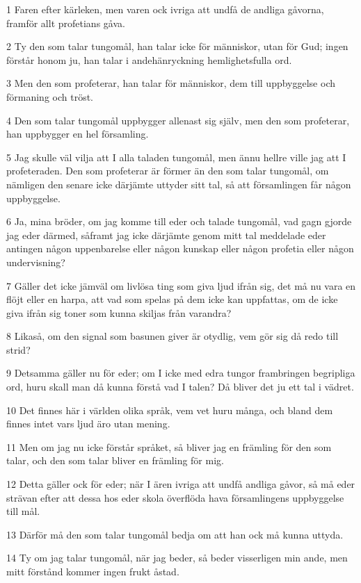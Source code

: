\par 1 Faren efter kärleken, men varen ock ivriga att undfå de andliga gåvorna, framför allt profetians gåva.
\par 2 Ty den som talar tungomål, han talar icke för människor, utan för Gud; ingen förstår honom ju, han talar i andehänryckning hemlighetsfulla ord.
\par 3 Men den som profeterar, han talar för människor, dem till uppbyggelse och förmaning och tröst.
\par 4 Den som talar tungomål uppbygger allenast sig själv, men den som profeterar, han uppbygger en hel församling.
\par 5 Jag skulle väl vilja att I alla taladen tungomål, men ännu hellre ville jag att I profeteraden. Den som profeterar är förmer än den som talar tungomål, om nämligen den senare icke därjämte uttyder sitt tal, så att församlingen får någon uppbyggelse.
\par 6 Ja, mina bröder, om jag komme till eder och talade tungomål, vad gagn gjorde jag eder därmed, såframt jag icke därjämte genom mitt tal meddelade eder antingen någon uppenbarelse eller någon kunskap eller någon profetia eller någon undervisning?
\par 7 Gäller det icke jämväl om livlösa ting som giva ljud ifrån sig, det må nu vara en flöjt eller en harpa, att vad som spelas på dem icke kan uppfattas, om de icke giva ifrån sig toner som kunna skiljas från varandra?
\par 8 Likaså, om den signal som basunen giver är otydlig, vem gör sig då redo till strid?
\par 9 Detsamma gäller nu för eder; om I icke med edra tungor frambringen begripliga ord, huru skall man då kunna förstå vad I talen? Då bliver det ju ett tal i vädret.
\par 10 Det finnes här i världen olika språk, vem vet huru många, och bland dem finnes intet vars ljud äro utan mening.
\par 11 Men om jag nu icke förstår språket, så bliver jag en främling för den som talar, och den som talar bliver en främling för mig.
\par 12 Detta gäller ock för eder; när I ären ivriga att undfå andliga gåvor, så må eder strävan efter att dessa hos eder skola överflöda hava församlingens uppbyggelse till mål.
\par 13 Därför må den som talar tungomål bedja om att han ock må kunna uttyda.
\par 14 Ty om jag talar tungomål, när jag beder, så beder visserligen min ande, men mitt förstånd kommer ingen frukt åstad.
